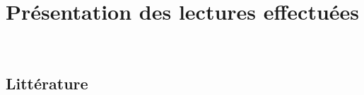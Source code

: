 

\section{Présentation des lectures effectuées}


\begin{hangparas}{.25in}{1}

~\cite{Mestre:1996aa}

 
\end{hangparas}

\subsection{Littérature}
~\cite[extraits]{Claudel:1934aa}

%
